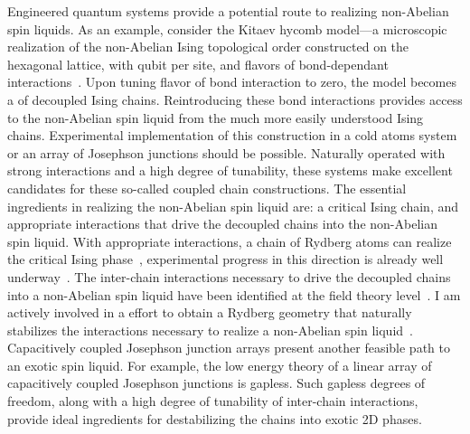 {
Engineered quantum systems  provide a potential route to realizing non-Abelian spin liquids. As an example, consider the Kitaev hycomb model---a microscopic realization of the non-Abelian Ising topological order constructed on the hexagonal lattice, with  qubit per site, and  flavors of bond-dependant interactions~\cite{Kitaev2006}. Upon tuning  flavor of bond interaction to zero, the model becomes a  of decoupled Ising chains. Reintroducing these bond interactions provides access to the non-Abelian spin liquid from the much more easily understood Ising chains. Experimental implementation of this construction in a cold atoms system or an array of Josephson junctions should be possible. Naturally operated with strong interactions and a high degree of tunability, these systems make excellent candidates for these so-called coupled chain constructions. The  essential ingredients in realizing the non-Abelian spin liquid are: a critical Ising chain, and appropriate interactions that drive the decoupled chains into the non-Abelian spin liquid. With appropriate interactions, a chain of Rydberg atoms can realize the critical Ising phase~\cite{Fendely2004}, experimental progress in this direction is already well underway~\cite{Bernien2017}. The inter-chain interactions necessary to drive the decoupled chains into a non-Abelian spin liquid have been identified at the field theory level~\cite{Aasen20}. I am actively involved in a  effort to obtain a Rydberg geometry that naturally stabilizes the interactions necessary to realize a non-Abelian spin liquid~\cite{Slagle2020}. Capacitively coupled Josephson junction arrays present another feasible path to an exotic spin liquid. For example, the low energy theory of a linear array of capacitively coupled Josephson junctions is gapless. Such gapless degrees of freedom, along with a high degree of tunability of inter-chain interactions, provide ideal ingredients for destabilizing the chains into exotic 2D phases.
}





